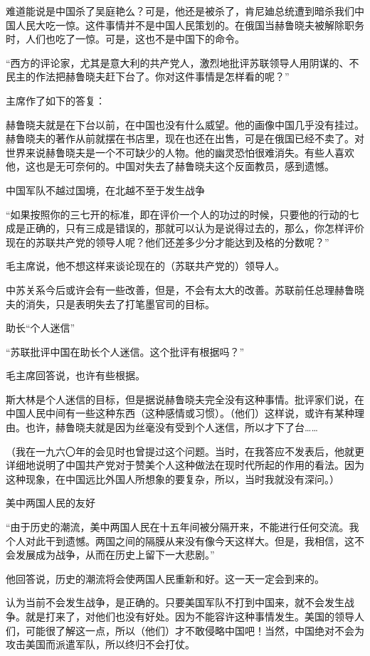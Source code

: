 难道能说是中国杀了吴庭艳么？可是，他还是被杀了，肯尼廸总统遭到暗杀我们中国人民大吃一惊。这件事情并不是中国人民策划的。在俄国当赫鲁晓夫被解除职务时，人们也吃了一惊。可是，这也不是中国下的命令。

“西方的评论家，尤其是意大利的共产党人，激烈地批评苏联领导人用阴谋的、不民主的作法把赫鲁晓夫赶下台了。你对这件事情是怎样看的呢？”

主席作了如下的答复：

赫鲁晓夫就是在下台以前，在中国也没有什么威望。他的画像中国几乎没有挂过。赫鲁晓夫的著作从前就摆在书店里，现在也还在出售，可是在俄国已经不卖了。对世界来说赫鲁晓夫是一个不可缺少的人物。他的幽灵恐怕很难消失。有些人喜欢他，这也是无可奈何的。中国对失去了赫鲁晓夫这个反面教员，感到遗憾。

中国军队不越过国境，在北越不至于发生战争

“如果按照你的三七开的标准，即在评价一个人的功过的时候，只要他的行动的七成是正确的，只有三成是错误的，那就可以认为是说得过去的，那么，你怎样评价现在的苏联共产党的领导人呢？他们还差多少分才能达到及格的分数呢？”

毛主席说，他不想这样来谈论现在的（苏联共产党的）领导人。

中苏关系今后或许会有一些改善，但是，不会有太大的改善。苏联前任总理赫鲁晓夫的消失，只是表明失去了打笔墨官司的目标。

助长“个人迷信”

“苏联批评中国在助长个人迷信。这个批评有根据吗？”

毛主席回答说，也许有些根据。

斯大林是个人迷信的目标，但是据说赫鲁晓夫完全没有这种事情。批评家们说，在中国人民中间有一些这种东西（这种感情或习惯）。（他们）这样说，或许有某种理由。也许，赫鲁晓夫就是因为丝毫没有受到个人迷信，所以才下了台……

（我在一九六〇年的会见时也曾提过这个问题。当时，在我答应不发表后，他就更详细地说明了中国共产党对于赞美个人这种做法在现时代所起的作用的看法。因为这种现象，在中国远比外国人所想象的要复杂，所以，当时我就没有深问。）

美中两国人民的友好

“由于历史的潮流，美中两国人民在十五年间被分隔开来，不能进行任何交流。我个人对此干到遗憾。两国之间的隔膜从来没有像今天这样大。但是，我相信，这不会发展成为战争，从而在历史上留下一大悲剧。”

他回答说，历史的潮流将会使两国人民重新和好。这一天一定会到来的。

认为当前不会发生战争，是正确的。只要美国军队不打到中国来，就不会发生战争。就是打来了，对他们也没有好处。因为不能容许这种事情发生。美国的领导人们，可能很了解这一点，所以（他们）才不敢侵略中国吧！当然，中国绝对不会为攻击美国而派遣军队，所以终归不会打仗。

